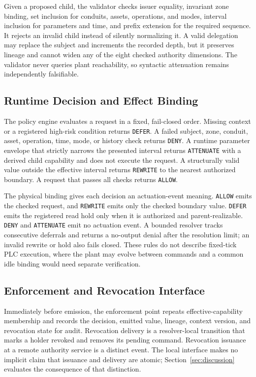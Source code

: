 Given a proposed child, the validator checks issuer equality, invariant zone binding, set inclusion for conduits, assets, operations, and modes, interval inclusion for parameters and time, and prefix extension for the required sequence. It rejects an invalid child instead of silently normalizing it. A valid delegation may replace the subject and increments the recorded depth, but it preserves lineage and cannot widen any of the eight checked authority dimensions. The validator never queries plant reachability, so syntactic attenuation remains independently falsifiable.

\subsection{Runtime Decision and Effect Binding}

The policy engine evaluates a request in a fixed, fail-closed order. Missing context or a registered high-risk condition returns \texttt{DEFER}. A failed subject, zone, conduit, asset, operation, time, mode, or history check returns \texttt{DENY}. A runtime parameter envelope that strictly narrows the presented interval returns \texttt{ATTENUATE} with a derived child capability and does not execute the request. A structurally valid value outside the effective interval returns \texttt{REWRITE} to the nearest authorized boundary. A request that passes all checks returns \texttt{ALLOW}.

The physical binding gives each decision an actuation-event meaning. \texttt{ALLOW} emits the checked request, and \texttt{REWRITE} emits only the checked boundary value. \texttt{DEFER} emits the registered read hold only when it is authorized and parent-realizable. \texttt{DENY} and \texttt{ATTENUATE} emit no actuation event. A bounded resolver tracks consecutive deferrals and returns a no-output denial after the resolution limit; an invalid rewrite or hold also fails closed. These rules do not describe fixed-tick PLC execution, where the plant may evolve between commands and a common idle binding would need separate verification.

\subsection{Enforcement and Revocation Interface}

Immediately before emission, the enforcement point repeats effective-capability membership and records the decision, emitted value, lineage, context version, and revocation state for audit. Revocation delivery is a resolver-local transition that marks a holder revoked and removes its pending command. Revocation issuance at a remote authority service is a distinct event. The local interface makes no implicit claim that issuance and delivery are atomic; Section~\ref{sec:discussion} evaluates the consequence of that distinction.

